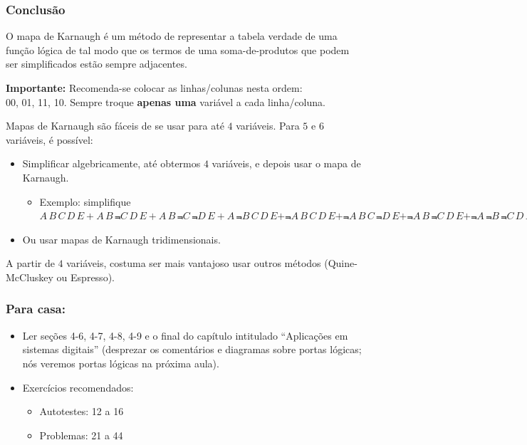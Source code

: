 \documentclass{beamer}
\begin{document}
\begin{frame}
\frametitle{Conclusão}

O mapa de Karnaugh é um método de representar a tabela verdade
de uma função lógica de tal modo que os termos de uma soma-de-produtos
que podem ser simplificados estão sempre adjacentes.

\vspace{6pt}

\textbf{Importante: } Recomenda-se colocar as linhas/colunas nesta
ordem:\\00, 01, 11, 10. Sempre troque \textbf{apenas uma} variável
a cada linha/coluna.

\vspace{6pt} \pause

Mapas de Karnaugh são fáceis de se usar para até $4$ variáveis. \pause Para
$5$ e $6$ variáveis, é possível:
\begin{itemize}
\item Simplificar algebricamente, até obtermos $4$ variáveis, e
depois usar o mapa de Karnaugh.
\begin{itemize}
\item Exemplo: simplifique $A \, B \, C \, D \, E +
A \, B \, \Not{C} \, D \, E  +  A \, B \, \Not{C} \, \Not{D} \, E  +
A \, \Not{B} \, C \, D \, E +  \Not{A} \, B \, C \, D \, E  +
\Not{A} \, B \, C \, \Not{D} \, E + \Not{A} \, B \, \Not{C} \, D \, E  +
\Not{A} \, \Not{B} \, \Not{C} \, D \, E$
\end{itemize}
\pause
\item Ou usar mapas de Karnaugh tridimensionais.
\end{itemize}

\vspace{6pt} \pause

A partir de $4$ variáveis, costuma ser mais vantajoso usar outros métodos
(Quine-McCluskey ou Espresso).

\end{frame}

\begin{frame}
\frametitle{Para casa:}

\begin{itemize}
\item Ler seções 4-6, 4-7, 4-8, 4-9 e o final do capítulo intitulado
``Aplicações em sistemas digitais'' (desprezar os comentários e diagramas
sobre portas lógicas; nós veremos portas lógicas na próxima aula).
\item Exercícios recomendados:
\begin{itemize}
\item Autotestes: 12 a 16
\item Problemas: 21 a 44
\end{itemize}
\end{itemize}
\end{frame}
\end{document}
